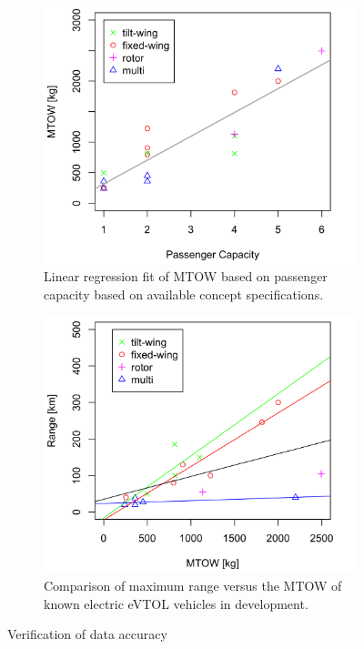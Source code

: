 \vspace{-4mm}

\begin{figure}[H]
\begin{subfigure}[t]{0.5\textwidth}
    \centering
    \includegraphics[width=\textwidth]{Figures/MTOW-Pax.png}
    \captionsetup{width=.8\linewidth}
    \caption{Linear regression fit of MTOW based on passenger capacity based on available concept specifications.}
    \label{fig:MTOW-Pax}
\end{subfigure}
\begin{subfigure}[t]{0.5\textwidth}
    \centering
    \includegraphics[width=\textwidth]{Figures/MTOW-Range.png}
    \captionsetup{width=.8\linewidth}
    \caption{Comparison of maximum range versus the MTOW of known electric eVTOL vehicles in development.}
    \label{fig:MTOW-Range}
\end{subfigure}
\captionsetup{justification=centering}
\caption{Verification of data accuracy}
\label{fig:MTOW-stats}
\end{figure}

